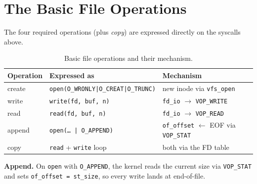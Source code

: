\documentclass[11pt,a4paper]{article}
\begin{document}
\FloatBarrier
\section{The Basic File Operations}
The four required operations (plus \emph{copy}) are expressed directly on the
syscalls above.

\begin{table}[H]
\centering
\caption{Basic file operations and their mechanism.}\label{tab:ops}
\begin{tabular}{@{}l l l@{}}
\toprule
\textbf{Operation} & \textbf{Expressed as} & \textbf{Mechanism} \\
\midrule
create & \texttt{open(O\_WRONLY|O\_CREAT|O\_TRUNC)} & new inode via \texttt{vfs\_open} \\
write  & \texttt{write(fd, buf, n)}                 & \texttt{fd\_io} $\to$ \texttt{VOP\_WRITE} \\
read   & \texttt{read(fd, buf, n)}                  & \texttt{fd\_io} $\to$ \texttt{VOP\_READ} \\
append & \texttt{open(\dots\,|\,O\_APPEND)}         & \texttt{of\_offset} $\gets$ EOF via \texttt{VOP\_STAT} \\
copy   & \texttt{read} + \texttt{write} loop        & both via the FD table \\
\bottomrule
\end{tabular}
\end{table}

\noindent\textbf{Append.} On \texttt{open} with \texttt{O\_APPEND}, the kernel
reads the current size via \texttt{VOP\_STAT} and sets
\texttt{of\_offset = st\_size}, so every write lands at end-of-file.

\FloatBarrier
\end{document}
